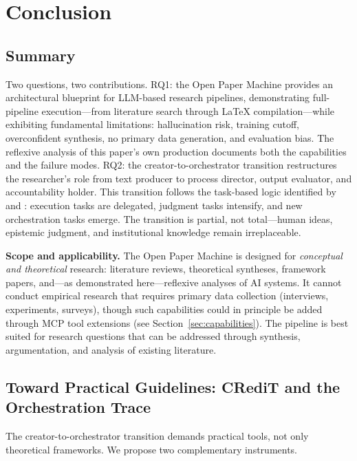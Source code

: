 \documentclass{article}
\begin{document}
\section{Conclusion}
\label{sec:conclusion}

\subsection{Summary}

Two questions, two contributions. RQ1: the Open Paper Machine provides an architectural blueprint for LLM-based research pipelines, demonstrating full-pipeline execution---from literature search through \LaTeX{} compilation---while exhibiting fundamental limitations: hallucination risk, training cutoff, overconfident synthesis, no primary data generation, and evaluation bias. The reflexive analysis of this paper's own production documents both the capabilities and the failure modes. RQ2: the creator-to-orchestrator transition restructures the researcher's role from text producer to process director, output evaluator, and accountability holder. This transition follows the task-based logic identified by \citet{autor2015why} and \citet{acemoglu2018automation}: execution tasks are delegated, judgment tasks intensify, and new orchestration tasks emerge. The transition is partial, not total---human ideas, epistemic judgment, and institutional knowledge remain irreplaceable.

\textbf{Scope and applicability.} The Open Paper Machine is designed for \textit{conceptual and theoretical} research: literature reviews, theoretical syntheses, framework papers, and---as demonstrated here---reflexive analyses of AI systems. It cannot conduct empirical research that requires primary data collection (interviews, experiments, surveys), though such capabilities could in principle be added through MCP tool extensions (see Section~\ref{sec:capabilities}). The pipeline is best suited for research questions that can be addressed through synthesis, argumentation, and analysis of existing literature.

\subsection{Toward Practical Guidelines: CRediT and the Orchestration Trace}

The creator-to-orchestrator transition demands practical tools, not only theoretical frameworks. We propose two complementary instruments.
\end{document}
